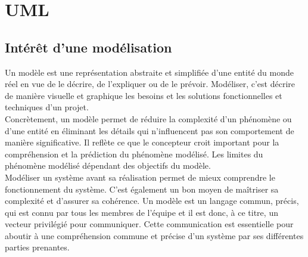 \chapter{UML}

\section{Intérêt d'une modélisation}
Un modèle est une représentation abstraite et simplifiée d'une entité du monde réel en vue de le décrire, de l'expliquer ou de le prévoir. Modéliser, c’est décrire de manière visuelle et graphique les besoins et les solutions fonctionnelles et techniques d'un projet.\\
Concrètement, un modèle permet de réduire la complexité d'un phénomène ou d'une entité en éliminant les détails qui n'influencent pas son comportement de manière significative. Il reflète ce que le concepteur croit important pour la compréhension et la prédiction du phénomène modélisé. Les limites du phénomène modélisé dépendant des objectifs du modèle.\\
Modéliser un système avant sa réalisation permet de mieux comprendre le fonctionnement du système. C’est également un bon moyen de maîtriser sa complexité et d’assurer sa cohérence. Un modèle est un langage commun, précis, qui est connu par tous les membres de l’équipe et il est donc, à ce titre, un vecteur privilégié pour communiquer. Cette communication est essentielle pour aboutir à une compréhension commune  et précise d'un système par ses différentes parties prenantes.

